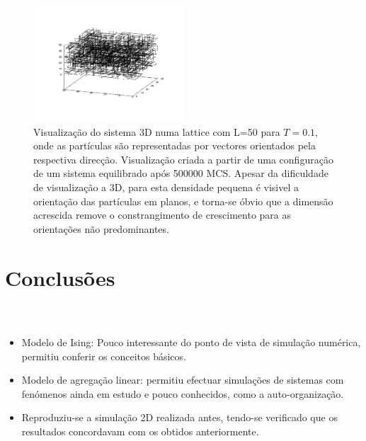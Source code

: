 \documentclass[11pt]{beamer}
\begin{document}
\begin{frame}
\frametitle{\insertsection \\ {\small \insertsubsection}}
\begin{figure}
	\centering
		\includegraphics[width=0.5\textwidth, clip, trim = 2.7cm 2.5cm 2cm 2cm]{images/rods3d}
	\caption{{\footnotesize Visualização do sistema 3D numa lattice com L=50 para $T=0.1$, onde as partículas são representadas por vectores orientados pela respectiva direcção. Visualização criada a partir de uma configuração de um sistema equilibrado após 500000 MCS. Apesar da dificuldade de visualização a 3D, para esta densidade pequena é visivel a orientação das partículas em planos, e torna-se óbvio que a dimensão acrescida remove o constrangimento de crescimento para as orientações não predominantes.}}     
	\label{fig:21}
\end{figure}
\end{frame}

\section{Conclusões}
\begin{frame}
\frametitle{\insertsection \\ {\small \insertsubsection}}
\begin{itemize}
\item Modelo de Ising: Pouco interessante do ponto de vista de simulação numérica, permitiu conferir os conceitos básicos.
\item Modelo de agregação linear: permitiu efectuar simulações de sistemas com fenómenos ainda em estudo e pouco conhecidos, como a auto-organização.
\item Reproduziu-se a simulação 2D realizada antes, tendo-se verificado que os resultados concordavam com os obtidos anteriormente.

\end{itemize}
\end{frame}
\end{document}
